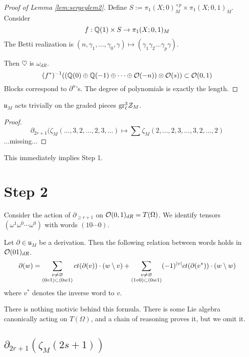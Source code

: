 \begin{proof}[Proof of Lemma \ref{lem:sergeylem2}]
Define $S := \pi_1(X;0)_M^{\times p} \times \pi_1(X;0,1)_M$. Consider
\[
f: \mathbb{Q}(1) \times S \to \pi_1(X;0,1)_M
\]
The Betti realization is $(n, \gamma_1, \ldots, \gamma_0, \gamma) \mapsto (\gamma_1 \gamma_2 \ldots \gamma_p \gamma)$.

Then $\heartsuit$ is $\omega_{dR}$.
\[
(f^*)^{-1}((\mathbb{Q}(0) \oplus \mathbb{Q}(-1) \oplus \cdots \oplus \mathcal{O}(-n)) \otimes \mathcal{O}(s)) \subset \mathcal{O}(0,1)
\]
Blocks correspond to $\partial^n$'s. The degree of polynomials is exactly the length.
\end{proof}

\begin{prop}[Step 1]
$\mathfrak{u}_M$ acts trivially on the graded pieces $\mathrm{gr}_{\ell}^3 \mathcal{Z}_M$.
\end{prop}
\begin{proof}
\[
\partial_{2r+1}(\zeta_M(\ldots, 3, 2, \ldots, 2, 3, \ldots) \mapsto \sum \zeta_M(2, \ldots, 2, 3, \ldots, 3, 2, \ldots, 2)
\]
...missing...
\end{proof}
This immediately implies Step 1.

\section{Step 2}
Consider the action of $\partial_{\geq r+1}$ on $\mathcal{O}(0,1)_{dR} = T(\Omega)$. We identify tensors $(\omega^1 \omega^0 \cdots \omega^0)$ with words $(10 \cdots 0)$.
\begin{thm}\label{thm:goncharov}
Let $\partial \in \mathfrak{u}_M$ be a derivation. Then the following relation between words holds in $\mathcal{O}(01)_{dR}$.
\[
\partial(w) = \sum_{\begin{subarray}{c}
v \neq \varnothing \\
(0v1) \subset (0w1)
\end{subarray}}
c t(\partial(v)) \cdot (w \setminus v) + \sum_{\begin{subarray}{c}
v \neq \varnothing \\
(1v0) \subset (0w1)
\end{subarray}} (-1)^{|v|} c t(\partial(v^*)) \cdot (w \setminus w)
\]
where $v^{*}$ denotes the inverse word to $v$.
\end{thm}
There is nothing motivic behind this formula. There is some Lie algebra canonically acting on $T(\Omega)$, and a chain of reasoning proves it, but we omit it.

\subsection{$\partial_{2r+1}(\zeta_M(2s+1))$}

